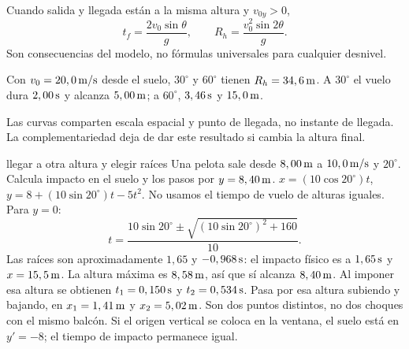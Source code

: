 \documentclass[11pt,a4paper]{article}
\begin{document}
Cuando salida y llegada est\'an a la misma altura y $v_{0y}>0$,
\[
t_f=\frac{2v_0\sin\theta}g,\qquad
R_h=\frac{v_0^2\sin2\theta}g.
\]
Son consecuencias del modelo, no f\'ormulas universales para cualquier desnivel.

Con $v_0=20,0\,\mathrm{m/s}$ desde el suelo, $30^\circ$ y $60^\circ$ tienen
$R_h=34,6\,\mathrm{m}$. A $30^\circ$ el vuelo dura $2,00\,\mathrm{s}$ y alcanza
$5,00\,\mathrm{m}$; a $60^\circ$, $3,46\,\mathrm{s}$ y $15,0\,\mathrm{m}$.
\begin{center}
\end{center}
Las curvas comparten escala espacial y punto de llegada, no instante de llegada.
La complementariedad deja de dar este resultado si cambia la altura final.

\begin{examplebox}{llegar a otra altura y elegir ra\'ices}
 Una pelota sale desde $8,00\,\mathrm{m}$ a $10,0\,\mathrm{m/s}$
y $20^\circ$. Calcula impacto en el suelo y los pasos por $y=8,40\,\mathrm{m}$.
\solutionblock
{} $x=(10\cos20^\circ)t$, $y=8+(10\sin20^\circ)t-5t^2$.
No usamos el tiempo de vuelo de alturas iguales.
 Para $y=0$:
\[
t=\frac{10\sin20^\circ\pm\sqrt{(10\sin20^\circ)^2+160}}{10}.
\]
Las ra\'ices son aproximadamente $1,65$ y $-0,968\,\mathrm{s}$:
el impacto f\'isico es a $1,65\,\mathrm{s}$ y $x=15,5\,\mathrm{m}$.
La altura m\'axima es $8,58\,\mathrm{m}$, as\'i que s\'i alcanza $8,40\,\mathrm{m}$.
Al imponer esa altura se obtienen
$t_1=0,150\,\mathrm{s}$ y $t_2=0,534\,\mathrm{s}$.
 Pasa por esa altura subiendo y bajando,
en $x_1=1,41\,\mathrm{m}$ y $x_2=5,02\,\mathrm{m}$.
Son dos puntos distintos, no dos choques con el mismo balc\'on.
Si el origen vertical se coloca en la ventana, el suelo est\'a en $y'=-8$;
el tiempo de impacto permanece igual.
\end{examplebox}
\end{document}
